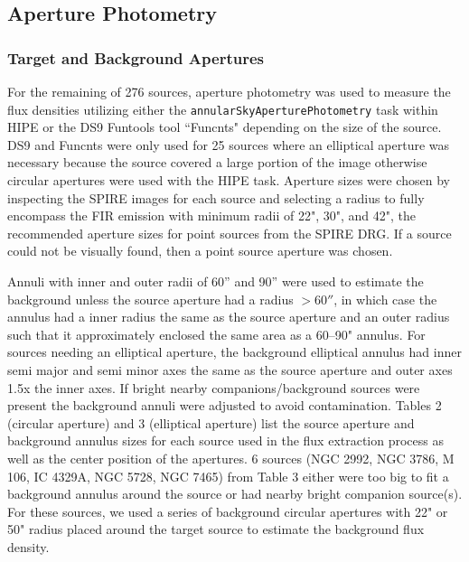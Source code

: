 \subsection{Aperture Photometry}\label{aperture}
\subsubsection{Target and Background Apertures}
For the remaining of 276 sources, aperture photometry was used to measure the flux densities utilizing either the \texttt{annularSkyAperturePhotometry} task within HIPE or the DS9 Funtools tool ``Funcnts" depending on the size of the source. DS9 and Funcnts were only used for 25 sources where an elliptical aperture was necessary because the source covered a large portion of the image otherwise circular apertures were used with the HIPE task. Aperture sizes were chosen by inspecting the SPIRE images for each source and selecting a radius to fully encompass the FIR emission with minimum radii of 22", 30", and 42", the recommended aperture sizes for point sources from the SPIRE DRG. If a source could not be visually found, then a point source aperture was chosen. 

Annuli with inner and outer radii of 60'' and 90'' were used to estimate the background unless the source aperture had a radius $>60''$, in which case the annulus had a inner radius the same as the source aperture and an outer radius such that it approximately enclosed the same area as a 60--90" annulus. For sources needing an elliptical aperture, the background elliptical annulus had inner semi major and semi minor axes the same as the source aperture and outer axes 1.5x the inner axes. If bright nearby companions/background sources were present the background annuli were adjusted to avoid contamination. Tables 2 (circular aperture) and 3 (elliptical aperture) list the source aperture and background annulus sizes for each source used in the flux extraction process as well as the center position of the apertures. 6 sources (NGC 2992, NGC 3786, M 106, IC 4329A, NGC 5728, NGC 7465) from Table 3 either were too big to fit a background annulus around the source or had nearby bright companion source(s). For these sources, we used a series of background circular apertures with 22" or 50" radius placed around the target source to estimate the background flux density.


